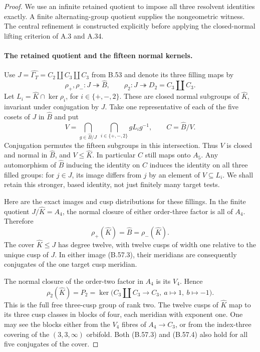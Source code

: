\begin{proof}
We use an infinite retained quotient to impose all three
resolvent identities exactly. A finite alternating-group
quotient supplies the nongeometric witness. The central
refinement is constructed explicitly before applying the
closed-normal lifting criterion of A.3 and A.34.

\paragraph{The retained quotient and the fifteen normal kernels.}
Use $J=\widehat{\Gamma_T}=C_2\amalg C_3\amalg C_3$ from B.53
and denote its three filling maps by
\[
 \rho_+,\rho_-:J\twoheadrightarrow\widehat B,\qquad
 \rho_2:J\twoheadrightarrow D_2=C_3\amalg C_3.
\]
Let $L_i=\widehat K\cap\ker\rho_i$, for
$i\in\{+,-,2\}$. These are closed normal subgroups of
$\widehat K$, invariant under conjugation by $J$.
Take one representative of each of the five cosets of $J$
in $\widehat B$ and put
\[
 V=\bigcap_{g\in\widehat B/J}\ \bigcap_{i\in\{+,-,2\}}
                              gL_i g^{-1},\qquad
 C=\widehat B/V.                                          \tag{B.57.2}
\]
Conjugation permutes the fifteen subgroups in this
intersection. Thus $V$ is closed and normal in $\widehat B$,
and $V\leq\widehat K$. In particular $C$ still maps onto
$A_5$. Any automorphism of $\widehat B$ inducing the identity
on $C$ induces the identity on all three filled groups:
for $j\in J$, its image differs from $j$ by an element of
$V\subseteq L_i$. We shall retain this stronger, based
identity, not just finitely many target tests.

Here are the exact images and cusp distributions for these
fillings. In the finite quotient $J/\widehat K=A_4$,
the normal closure of either order-three factor is all
of $A_4$. Therefore
\[
                 \rho_+(\widehat K)=\widehat B
                      =\rho_-(\widehat K).                \tag{B.57.3}
\]
The cover $\widehat K\leq J$ has degree twelve, with twelve
cusps of width one relative to the unique cusp of $J$.
In either image (B.57.3), their meridians are consequently
conjugates of the one target cusp meridian.

The normal closure of the order-two factor in $A_4$ is
its $V_4$. Hence
\[
 \rho_2(\widehat K)=P_2
   =\ker\bigl(C_3\amalg C_3\longrightarrow C_3,\
                        a\mapsto1,\ b\mapsto-1\bigr).
                                                               \tag{B.57.4}
\]
This is the full free three-cusp group of rank two.
The twelve cusps of $\widehat K$ map to its three cusp
classes in blocks of four, each meridian with exponent
one. One may see the blocks either from the $V_4$ fibres
of $A_4\to C_3$, or from the index-three covering of the
$(3,3,\infty)$ orbifold. Both (B.57.3) and (B.57.4)
also hold for all five conjugates of the cover.


\end{proof}
